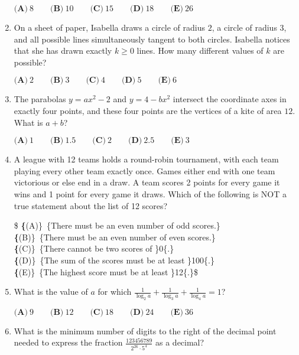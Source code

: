 \documentclass{article}
\begin{document}
\begin{enumerate}[label=\arabic*., itemsep=0.5em]
$ \textbf{(A)}\ 8 \qquad\textbf{(B)}\ 10 \qquad\textbf{(C)}\ 15 \qquad\textbf{(D)}\ 18 \qquad\textbf{(E)}\ 26$\par \vspace{0.5em}\item On a sheet of paper, Isabella draws a circle of radius $2$, a circle of radius $3$, and all possible lines simultaneously tangent to both circles. Isabella notices that she has drawn exactly $k \ge 0$ lines. How many different values of $k$ are possible?

$ \textbf{(A)}\ 2 \qquad\textbf{(B)}\ 3 \qquad\textbf{(C)}\ 4 \qquad\textbf{(D)}\ 5\qquad\textbf{(E)}\ 6$\par \vspace{0.5em}\item The parabolas $y=ax^2 - 2$ and $y=4 - bx^2$ intersect the coordinate axes in exactly four points, and these four points are the vertices of a kite of area $12$. What is $a+b$?

$ \textbf{(A)}\ 1\qquad\textbf{(B)}\ 1.5\qquad\textbf{(C)}\ 2\qquad\textbf{(D)}\ 2.5\qquad\textbf{(E)}\ 3$\par \vspace{0.5em}\item A league with 12 teams holds a round-robin tournament, with each team playing every other team exactly once. Games either end with one team victorious or else end in a draw. A team scores 2 points for every game it wins and 1 point for every game it draws. Which of the following is NOT a true statement about the list of 12 scores?

\$ \textbf\{(A)\}\ \text\{There must be an even number of odd scores.\}\\
\qquad\textbf\{(B)\}\ \text\{There must be an even number of even scores.\}\\
\qquad\textbf\{(C)\}\ \text\{There cannot be two scores of \}0\text\{.\}\\
\qquad\textbf\{(D)\}\ \text\{The sum of the scores must be at least \}100\text\{.\}\\
\qquad\textbf\{(E)\}\ \text\{The highest score must be at least \}12\text\{.\}\$\par \vspace{0.5em}\item What is the value of $a$ for which $\frac{1}{\log_2 a} + \frac{1}{\log_3 a} + \frac{1}{\log_4 a} = 1$?

$\textbf{(A)}\ 9\qquad\textbf{(B)}\ 12\qquad\textbf{(C)}\ 18\qquad\textbf{(D)}\ 24\qquad\textbf{(E)}\ 36$\par \vspace{0.5em}\item What is the minimum number of digits to the right of the decimal point needed to express the fraction $\frac{123456789}{2^{26}\cdot 5^4}$ as a decimal?


\end{enumerate}
\end{document}
